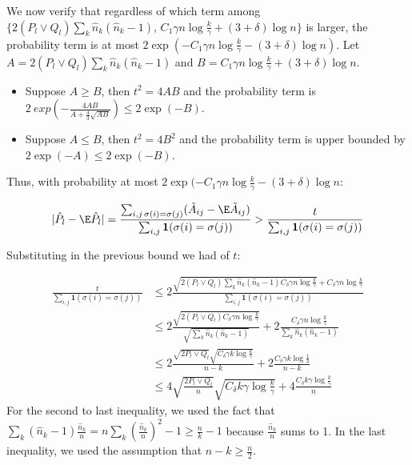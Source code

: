 \documentclass{article}
\begin{document}
We now verify that regardless of which term among $\{ 2 (P_l \vee Q_l) \sum_k \hat{n}_k (\hat{n}_k - 1) ,\, C_1 \gamma n \log \frac{k}{\gamma} + (3 + \delta)\log n \}$ is larger, the probability term is at most $2 \exp( - C_1 \gamma n \log \frac{k}{\gamma} - (3+\delta) \log n )$. Let $A = 2(P_l \vee Q_l)\sum_k \hat{n}_k (\hat{n}_k - 1)$ and $B = C_1 \gamma n \log \frac{k}{\gamma} + (3 + \delta) \log n$. 

\begin{itemize}
\item Suppose $A \geq B$, then $t^2 = 4 AB$ and the probability term is $2 \ exp \left( - \frac{4 AB}{A + \frac{4}{3} \sqrt{AB}} \right)  \leq 2 \exp( - B )$. 
\item Suppose $A \leq B$, then $t^2 = 4 B^2$ and the probability term is upper bounded by $2 \exp( - A ) \leq 2 \exp( - B)$. 
\end{itemize}

Thus, with probability at most $2\exp( - C_1 \gamma n \log \frac{k}{\gamma} - (3+\delta) \log n $:

\begin{align*}
| \hat{P}_l - \E \hat{P}_l | =
\frac{\sum_{i,j \, \sigma(i) = \sigma(j)} (\tilde{A}_{ij} - \E \tilde{A}_{ij} ) }{
  \sum_{i,j} \mathbf{1}( \sigma(i) = \sigma(j) ) } &> 
  \frac{t}{\sum_{i,j} \mathbf{1}(\sigma(i) = \sigma(j)) } \\
\end{align*}

Substituting in the previous bound we had of $t$:

\begin{align*}
 \frac{t}{\sum_{i,j} \mathbf{1}(\sigma(i) = \sigma(j)) } &\leq
  2 \frac{  \sqrt{  2 (P_l \vee Q_l) \sum_k \hat{n}_k (\hat{n}_k - 1) C_\delta \gamma n \log \frac{k}{\gamma} } + C_\delta \gamma n \log \frac{k}{\gamma} }
        { \sum_{i,j} \mathbf{1}(\sigma(i) = \sigma(j) ) }  \\
  &\leq 2 \frac{\sqrt{2 (P_l \vee Q_l) C_\delta \gamma n \log \frac{k}{\gamma}}}
             {\sqrt{ \sum_k \hat{n}_k (\hat{n}_k - 1)}} + 
        2  \frac{C_\delta \gamma n \log \frac{k}{\gamma}}
             {\sum_k \hat{n}_k (\hat{n}_k - 1)} \\
 &\leq  2 \frac{ \sqrt{2 P_l\vee Q_l} \sqrt{ C_\delta \gamma k \log \frac{k}{\gamma}} }
           {n - k} + 
       2 \frac{C_\delta \gamma k \log \frac{1}{\delta}}{n - k} \\
 &\leq 4 \sqrt{ \frac{2 P_l \vee Q_l}{n} } \sqrt{C_\delta k \gamma \log \frac{k}{\gamma}} + 
       4 \frac{C_\delta k \gamma \log \frac{k}{\gamma}}{n} 
\end{align*}
For the second to last inequality, we used the fact that $\sum_k (\hat{n}_k - 1) \frac{\hat{n}_k}{n} = n \sum_k \left( \frac{\hat{n}_k}{n} \right)^2 - 1 \geq \frac{n}{k} - 1 $ because $\frac{\hat{n}_k}{n}$ sums to 1. In the last inequality, we used the assumption that $n-k \geq \frac{n}{2}$. 
\end{document}
